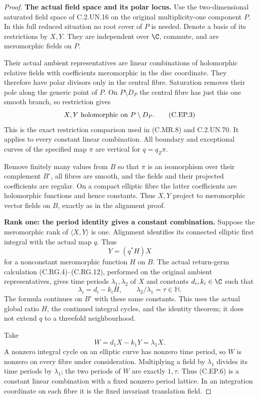 \begin{proof}
\par\medskip\noindent\textbf{The actual field space and its polar locus.}
Use the two-dimensional saturated field space of
C.2.UN.16 on the original multiplicity-one component
\(P\). In this full reduced situation no root cover
of \(P\) is needed. Denote a basis of its restrictions
by \(X,Y\). They are independent over \(\C\), commute,
and are meromorphic fields on \(P\).

Their actual ambient representatives are linear
combinations of holomorphic relative fields with
coefficients meromorphic in the disc coordinate.
They therefore have polar divisors only in the
central fibre. Saturation removes their pole along
the generic point of \(P\). On \(P\setminus D_P\)
the central fibre has just this one smooth branch,
so restriction gives
\[
       X,Y\ \hbox{holomorphic on }P\setminus D_P .
 \tag{C.EP.3}
\]
This is the exact restriction comparison used in
(C.MR.8) and C.2.UN.70. It applies to every constant
linear combination. All boundary and exceptional
curves of the specified map \(\pi\) are vertical
for \(q=q_Z\pi\).

Remove finitely many values from \(B\) so that
\(\pi\) is an isomorphism over their complement
\(B^\circ\), all fibres are smooth, and the fields
and their projected coefficients are regular.
On a compact elliptic fibre the latter coefficients
are holomorphic functions and hence constants.
Thus \(X,Y\) project to meromorphic vector fields
on \(B\), exactly as in the alignment proof.

\par\medskip\noindent\textbf{Rank one: the period identity gives a constant combination.}
Suppose the meromorphic rank of \(\langle X,Y\rangle\)
is one. Alignment identifies its connected elliptic
first integral with the actual map \(q\). Thus
\[
                       Y=(q^*H)X
 \tag{C.EP.4}
\]
for a nonconstant meromorphic function \(H\) on
\(B\). The actual return-germ calculation
(C.RG.4)--(C.RG.12), performed on the original
ambient representatives, gives time periods
\(\lambda_1,\lambda_2\) of \(X\) and constants
\(d_i,k_i\in\C\) such that
\[
            \lambda_i=d_i-k_iH,\qquad
            \lambda_2/\lambda_1=\tau\in\mathbb H .
 \tag{C.EP.5}
\]
The formula continues on \(B^\circ\) with these
same constants. This uses the actual global ratio
\(H\), the continued integral cycles, and the
identity theorem; it does not extend \(q\) to a
threefold neighbourhood.

Take
\[
                       W=d_1X-k_1Y=\lambda_1X.
 \tag{C.EP.6}
\]
A nonzero integral cycle on an elliptic curve has
nonzero time period, so \(W\) is nonzero on every
fibre under consideration. Multiplying a field by
\(\lambda_1\) divides its time periods by
\(\lambda_1\); the two periods of \(W\) are exactly
\(1,\tau\). Thus (C.EP.6) is a constant linear
combination with a fixed nonzero period lattice.
In an integration coordinate on each fibre it
is the fixed invariant translation field.


\end{proof}

